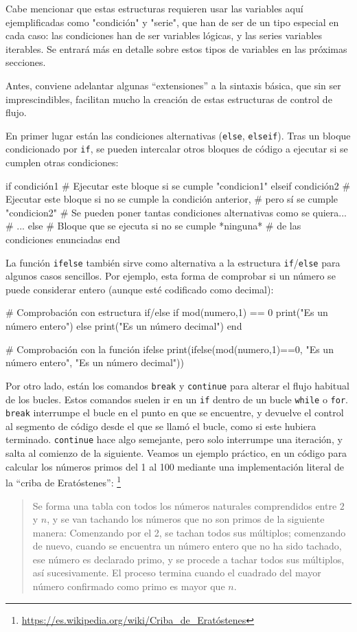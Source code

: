 ﻿\documentclass{article}
\newcommand{\jl}{\texttt}
\begin{document}
Cabe mencionar que estas estructuras requieren usar las variables aquí ejemplificadas como "condición" y "serie", que han de ser de un tipo especial en cada caso: las condiciones han de ser variables lógicas, y las series variables iterables. Se entrará más en detalle sobre estos tipos de variables en las próximas secciones.

Antes, conviene adelantar algunas ``extensiones'' a la sintaxis básica, que sin ser imprescindibles, facilitan mucho la creación de estas estructuras de control de flujo.

En primer lugar están las condiciones alternativas (\jl{else}, \jl{elseif}). Tras un bloque condicionado por \jl{if}, se pueden intercalar otros bloques de código a ejecutar si se cumplen otras condiciones:

if condición1
  # Ejecutar este bloque si se cumple "condicion1"
elseif condición2
  # Ejecutar este bloque si no se cumple la condición anterior,
  # pero sí se cumple "condicion2"
  # Se pueden poner tantas condiciones alternativas como se quiera...
  # ...
else
  # Bloque que se ejecuta si no se cumple *ninguna*
  # de las condiciones enunciadas
end

La función \jl{ifelse} también sirve como alternativa a la estructura \jl{if}/\jl{else} para algunos casos sencillos. Por ejemplo, esta forma de comprobar si un número se puede considerar entero (aunque esté codificado como decimal):

# Comprobación con estructura if/else
if mod(numero,1) == 0
  print("Es un número entero")
else
  print("Es un número decimal")
end

# Comprobación con la función ifelse
print(ifelse(mod(numero,1)==0, "Es un número entero", "Es un número decimal"))

Por otro lado, están los comandos \jl{break} y \jl{continue} para alterar el flujo habitual de los bucles. Estos comandos suelen ir en un \jl{if} dentro de un bucle \jl{while} o \jl{for}. \jl{break} interrumpe el bucle en el punto en que se encuentre, y devuelve el control al segmento de código desde el que se llamó el bucle, como si este hubiera terminado. \jl{continue} hace algo semejante, pero solo interrumpe una iteración, y salta al comienzo de la siguiente. Veamos un ejemplo práctico, en un código para calcular los números primos del 1 al 100 mediante una implementación literal de la ``criba de Eratóstenes'':%
\footnote{%
\url{https://es.wikipedia.org/wiki/Criba_de_Eratóstenes}%
}

\begin{quote}
Se forma una tabla con todos los números naturales comprendidos entre $2$ y $n$, y se van tachando los números que no son primos de la siguiente manera: Comenzando por el 2, se tachan todos sus múltiplos; comenzando de nuevo, cuando se encuentra un número entero que no ha sido tachado, ese número es declarado primo, y se procede a tachar todos sus múltiplos, así sucesivamente. El proceso termina cuando el cuadrado del mayor número confirmado como primo es mayor que $n$.
\end{quote}
\end{document}
